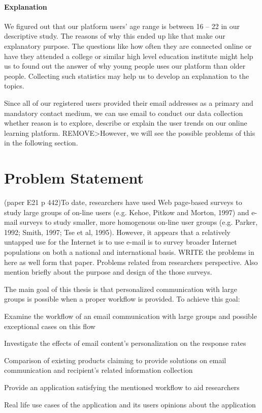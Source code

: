 \paragraph{Explanation}
We figured out that our platform users' age range is between 16 -- 22 in our descriptive study. The reasons of why this ended up like that make our explanatory purpose. The questions like how often they are connected online or have they attended a college or similar high level education institute might help us to found out the answer of why young people uses our platform than older people. Collecting such statistics may help us to develop an explanation to the topics.

\vspace{1cm}
Since all of our registered users provided their email addresses as a primary and mandatory contact medium, we can use email to conduct our data collection whether reason is to explore, describe or explain the user trends on our online learning platform. REMOVE>However, we will see the possible problems of this in the following section.

\section{Problem Statement}
\label{sec:2:Problem}
(paper E21 p 442)To date, researchers have used Web page-based surveys to study large groups of on-line users (e.g. Kehoe, Pitkow and Morton, 1997) and e-mail surveys to study smaller, more homogenous on-line user groups (e.g. Parker, 1992; Smith, 1997; Tse et al, 1995). However, it appears that a relatively untapped use for the Internet is to use e-mail is to survey broader Internet populations on both a national and international basis. WRITE the problems in here as well form that paper. Problems related from researchers perspective. Also mention briefly about the purpose and design of the those surveys.
\vspace{1cm}

The main goal of this thesis is that personalized communication with large groups is possible when a proper workflow is provided. To achieve this goal:

\begin{compactenum}
	\item Examine the workflow of an email communication with large groups and possible exceptional cases on this flow
	\item Investigate the effects of email content's personalization on the response rates
	\item Comparison of  existing products claiming to provide solutions on email communication and recipient's related information collection
	\item Provide an application satisfying the mentioned workflow to aid researchers
	\item Real life use cases of the application and its users opinions about the application
\end{compactenum}
\vspace{1cm}

